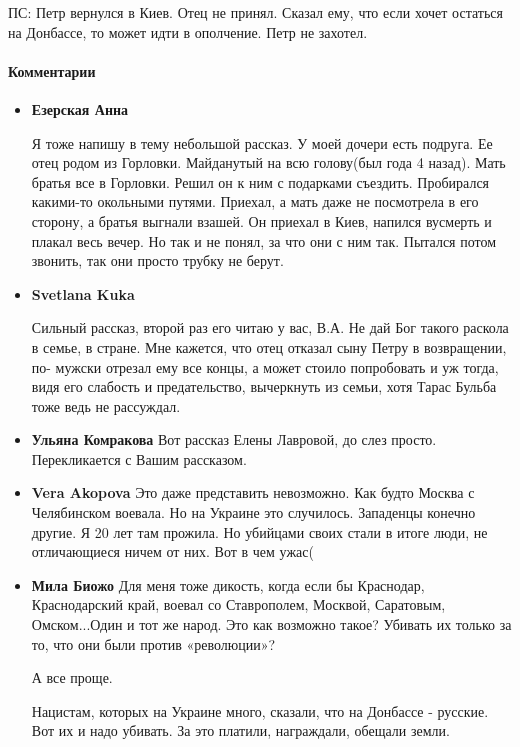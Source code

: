 ПС: Петр вернулся в Киев. Отец не принял. Сказал ему, что если хочет остаться
на Донбассе, то может идти в ополчение. Петр не захотел.
\restorecr

\paragraph{Комментарии}

\begin{itemize}
\item \textbf{Езерская Анна}

Я тоже напишу в тему небольшой рассказ. У моей дочери есть подруга. Ее отец
родом из Горловки. Майданутый на всю голову(был года 4 назад). Мать братья все
в Горловки. Решил он к ним с подарками съездить. Пробирался какими-то окольными
путями. Приехал, а мать даже не посмотрела в его сторону, а братья выгнали
взашей. Он приехал в Киев, напился вусмерть и плакал весь вечер. Но так и не
понял, за что они с ним так. Пытался потом звонить, так они просто трубку не
берут.

\item \textbf{Svetlana Kuka}

Сильный рассказ, второй раз его читаю у вас, В.А. Не дай Бог такого раскола в
семье, в стране. Мне кажется, что отец отказал сыну Петру в возвращении, по-
мужски отрезал ему все концы, а может стоило попробовать и уж тогда, видя его
слабость и предательство, вычеркнуть из семьи, хотя Тарас Бульба тоже ведь не
рассуждал.

\item \textbf{Ульяна Комракова}
Вот рассказ Елены Лавровой, до слез просто. Перекликается с Вашим рассказом.

\item \textbf{Vera Akopova}
Это даже представить невозможно. Как будто Москва с Челябинском воевала. Но на
Украине это случилось. Западенцы конечно другие. Я 20 лет там
прожила. Но убийцами своих стали в итоге люди, не отличающиеся
ничем от них. Вот в чем ужас(

\item \textbf{Мила Биожо}
Для меня тоже дикость, когда если бы Краснодар, Краснодарский край, воевал со
Ставрополем, Москвой, Саратовым, Омском...Один и тот же народ.
Это как возможно такое? Убивать их только за то, что они были
против «революции»?

А все проще.

Нацистам, которых на Украине много, сказали, что на Донбассе - русские. Вот их
и надо убивать. За это платили, награждали, обещали земли.


\end{itemize}
